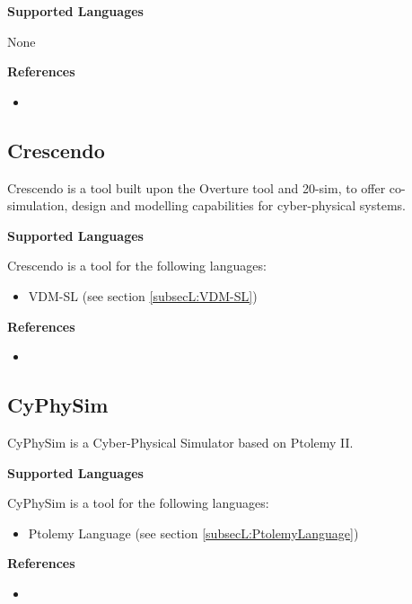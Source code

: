 \textbf{Supported Languages}

None


\textbf{References}
\begin{itemize}
	
\item {}
\end{itemize}



\subsection{Crescendo}
\label{subsecT:Crescendo}


Crescendo is a tool built upon the Overture tool and 20-sim, to offer co-simulation, design and modelling capabilities for cyber-physical systems.

\textbf{Supported Languages}

Crescendo is a tool for the following languages:
\begin{itemize}
	\item VDM-SL (see section \ref{subsecL:VDM-SL})
\end{itemize}


\textbf{References}
\begin{itemize}
	
\item {}
\end{itemize}



\subsection{CyPhySim}
\label{subsecT:CyPhySim}


CyPhySim is a Cyber-Physical Simulator based on Ptolemy II.

\textbf{Supported Languages}

CyPhySim is a tool for the following languages:
\begin{itemize}
	\item Ptolemy Language (see section \ref{subsecL:PtolemyLanguage})
\end{itemize}


\textbf{References}
\begin{itemize}
	
\item {}
\end{itemize}



